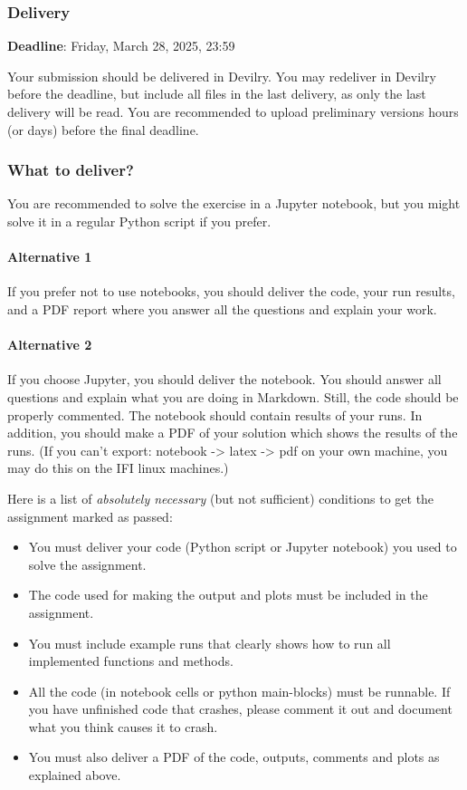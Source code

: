 \documentclass[a4paper,landscape]{article}
\providecommand{\tightlist}{%
      \setlength{\itemsep}{0pt}\setlength{\parskip}{0pt}}
\begin{document}
\subsubsection{Delivery}\label{delivery}

\textbf{Deadline}: Friday, March 28, 2025, 23:59

Your submission should be delivered in Devilry. You may redeliver in
Devilry before the deadline, but include all files in the last delivery,
as only the last delivery will be read. You are recommended to upload
preliminary versions hours (or days) before the final deadline.

\subsubsection{What to deliver?}\label{what-to-deliver}

You are recommended to solve the exercise in a Jupyter notebook, but you
might solve it in a regular Python script if you prefer.

\paragraph{Alternative 1}\label{alternative-1}

If you prefer not to use notebooks, you should deliver the code, your
run results, and a PDF report where you answer all the questions and
explain your work.

\paragraph{Alternative 2}\label{alternative-2}

If you choose Jupyter, you should deliver the notebook. You should
answer all questions and explain what you are doing in Markdown. Still,
the code should be properly commented. The notebook should contain
results of your runs. In addition, you should make a PDF of your
solution which shows the results of the runs. (If you can't export:
notebook -\textgreater{} latex -\textgreater{} pdf on your own machine,
you may do this on the IFI linux machines.)

Here is a list of \emph{absolutely necessary} (but not sufficient)
conditions to get the assignment marked as passed:

\begin{itemize}
\tightlist
\item
  You must deliver your code (Python script or Jupyter notebook) you
  used to solve the assignment.
\item
  The code used for making the output and plots must be included in the
  assignment.
\item
  You must include example runs that clearly shows how to run all
  implemented functions and methods.
\item
  All the code (in notebook cells or python main-blocks) must be
  runnable. If you have unfinished code that crashes, please comment it
  out and document what you think causes it to crash.
\item
  You must also deliver a PDF of the code, outputs, comments and plots
  as explained above.
\end{itemize}
\end{document}
